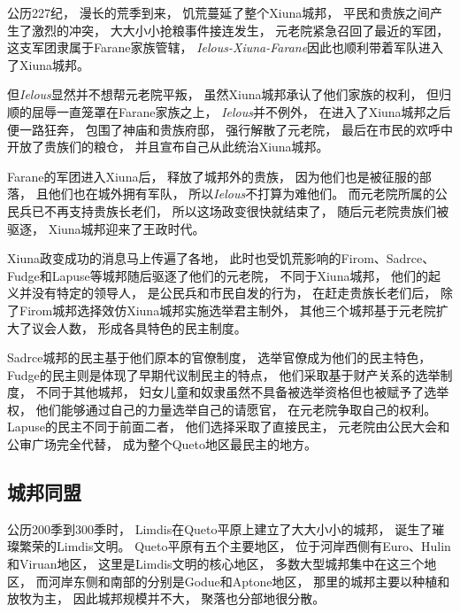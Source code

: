 \documentclass[UTF8,12pt,draft]{ctexbook}
\begin{document}
                公历227纪，
                漫长的荒季到来，
                饥荒蔓延了整个Xiuna城邦，
                平民和贵族之间产生了激烈的冲突，
                大大小小抢粮事件接连发生，
                元老院紧急召回了最近的军团，
                这支军团隶属于Farane家族管辖，
                \emph{Ielous-Xiuna-Farane}因此也顺利带着军队进入了Xiuna城邦。

                但\emph{Ielous}显然并不想帮元老院平叛，
                虽然Xiuna城邦承认了他们家族的权利，
                但归顺的屈辱一直笼罩在Farane家族之上，
                \emph{Ielous}并不例外，
                在进入了Xiuna城邦之后便一路狂奔，
                包围了神庙和贵族府邸，
                强行解散了元老院，
                最后在市民的欢呼中开放了贵族们的粮仓，
                并且宣布自己从此统治Xiuna城邦。

                Farane的军团进入Xiuna后，
                释放了城邦外的贵族，
                因为他们也是被征服的部落，
                且他们也在城外拥有军队，
                所以\emph{Ielous}不打算为难他们。
                而元老院所属的公民兵已不再支持贵族长老们，
                所以这场政变很快就结束了，
                随后元老院贵族们被驱逐，
                Xiuna城邦迎来了王政时代。

                Xiuna政变成功的消息马上传遍了各地，
                此时也受饥荒影响的Firom、Sadrce、Fudge和Lapuse等城邦随后驱逐了他们的元老院，
                不同于Xiuna城邦，
                他们的起义并没有特定的领导人，
                是公民兵和市民自发的行为，
                在赶走贵族长老们后，
                除了Firom城邦选择效仿Xiuna城邦实施选举君主制外，
                其他三个城邦基于元老院扩大了议会人数，
                形成各具特色的民主制度。

                Sadrce城邦的民主基于他们原本的官僚制度，
                选举官僚成为他们的民主特色，
                Fudge的民主则是体现了早期代议制民主的特点，
                他们采取基于财产关系的选举制度，
                不同于其他城邦，
                妇女儿童和奴隶虽然不具备被选举资格但也被赋予了选举权，
                他们能够通过自己的力量选举自己的请愿官，
                在元老院争取自己的权利。
                Lapuse的民主不同于前面二者，
                他们选择采取了直接民主，
                元老院由公民大会和公审广场完全代替，
                成为整个Queto地区最民主的地方。
            \subsection{城邦同盟}
                公历200季到300季时，
                Limdis在Queto平原上建立了大大小小的城邦，
                诞生了璀璨繁荣的Limdis文明。
                Queto平原有五个主要地区，
                位于河岸西侧有Euro、Hulin和Viruan地区，
                这里是Limdis文明的核心地区，
                多数大型城邦集中在这三个地区，
                而河岸东侧和南部的分别是Godue和Aptone地区，
                那里的城邦主要以种植和放牧为主，
                因此城邦规模并不大，
                聚落也分部地很分散。
                
\end{document}
